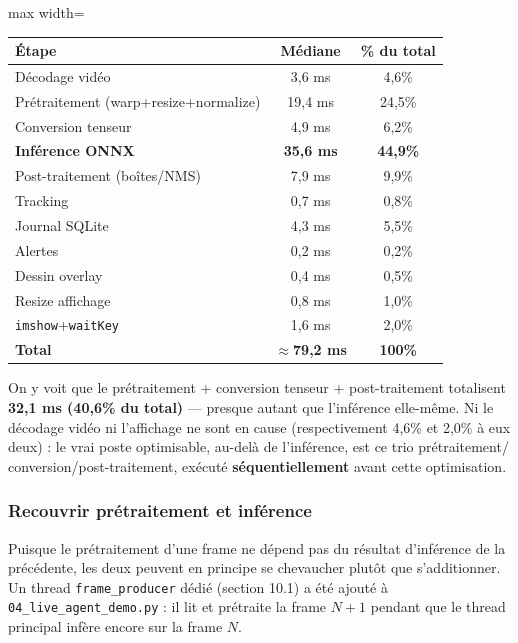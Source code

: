 \documentclass[11pt,a4paper]{article}
\let\Oldsubsubsection\subsubsection
\renewcommand{\subsubsection}{\FloatBarrier\Oldsubsubsection}
\begin{document}
    \begin{table}[!htbp]
    \centering
    \small
    \begin{adjustbox}{max width=\linewidth}
    \begin{tabular}{@{}lcc@{}}
    \toprule
    \textbf{Étape} & \textbf{Médiane} & \textbf{\% du total} \\
    \midrule
    Décodage vidéo & 3,6 ms & 4,6\% \\
    Prétraitement (warp+resize+normalize) & 19,4 ms & 24,5\% \\
    Conversion tenseur & 4,9 ms & 6,2\% \\
    \textbf{Inférence ONNX} & \textbf{35,6 ms} & \textbf{44,9\%} \\
    Post-traitement (boîtes/NMS) & 7,9 ms & 9,9\% \\
    Tracking & 0,7 ms & 0,8\% \\
    Journal SQLite & 4,3 ms & 5,5\% \\
    Alertes & 0,2 ms & 0,2\% \\
    Dessin overlay & 0,4 ms & 0,5\% \\
    Resize affichage & 0,8 ms & 1,0\% \\
    \texttt{imshow}+\texttt{waitKey} & 1,6 ms & 2,0\% \\
    \midrule
    \textbf{Total} & \textbf{$\approx$79,2 ms} & \textbf{100\%} \\
    \bottomrule
    \end{tabular}
    \end{adjustbox}
    \end{table}
    
    On y voit que le prétraitement + conversion tenseur + post-traitement
    totalisent \textbf{32,1 ms (40,6\% du total)} --- presque autant que
    l'inférence elle-même. Ni le décodage vidéo ni l'affichage ne sont en
    cause (respectivement 4,6\% et 2,0\% à eux deux) : le vrai poste
    optimisable, au-delà de l'inférence, est ce trio prétraitement/
    conversion/post-traitement, exécuté \textbf{séquentiellement} avant
    cette optimisation.
    
    \subsubsection{Recouvrir prétraitement et inférence}
    
    Puisque le prétraitement d'une frame ne dépend pas du résultat
    d'inférence de la précédente, les deux peuvent en principe se
    chevaucher plutôt que s'additionner. Un thread \texttt{frame\_producer}
    dédié (section 10.1) a été ajouté à \texttt{04\_live\_agent\_demo.py} :
    il lit et prétraite la frame $N+1$ pendant que le thread principal
    infère encore sur la frame $N$.
    
\end{document}
